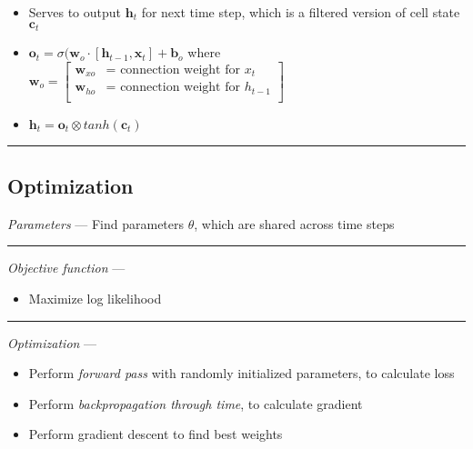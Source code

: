 \begin{itemize}
\begin{itemize}
\begin{itemize}
        \end{itemize}
        \item Serves to output $\boldsymbol{h}_t$ for next time step, which is a filtered version of cell state $\boldsymbol{c}_t$
        \item $\boldsymbol{o}_t = \sigma (\boldsymbol{w}_o \cdot [ \boldsymbol{h}_{t-1}, \boldsymbol{x}_t ] + \boldsymbol{b}_o $ where $\boldsymbol{w}_o = \begin{bmatrix}
        \boldsymbol{w}_{xo} & \textrm{= connection weight for } x_t \\
        \boldsymbol{w}_{ho} & \textrm{= connection weight for } h_{t-1} \\
        \end{bmatrix}$
        \item $\boldsymbol{h}_t = \boldsymbol{o}_t \otimes tanh(\boldsymbol{c}_t)$
    \end{itemize}
\end{itemize}

{\color{black}\hrule height 0.001mm}

\subsection*{Optimization}
\emph{Parameters} --- Find parameters $\theta$, which are shared across time steps

{\color{lightgray}\hrule height 0.001mm}

\emph{Objective function} --- 
\begin{itemize}
    \item Maximize log likelihood
\end{itemize}

{\color{lightgray}\hrule height 0.001mm}

\emph{Optimization} ---
\begin{itemize}
    \item Perform \emph{forward pass} with randomly initialized parameters, to calculate loss
    \item Perform \emph{backpropagation through time}, to calculate gradient
    \item Perform gradient descent to find best weights 
\end{itemize}